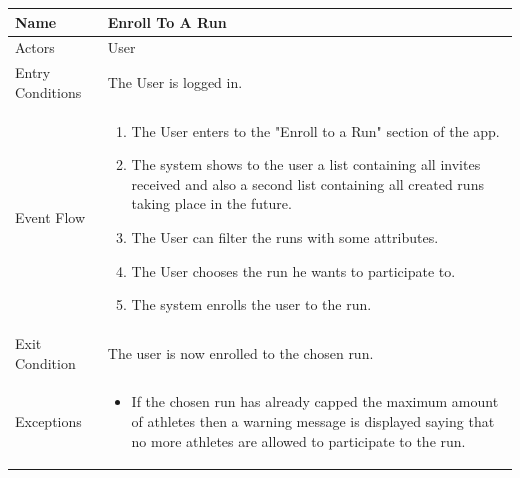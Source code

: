 \begin{enumerate}
\FloatBarrier
\begin{table}[h]
\begin{tabular}{|l|p{}|}
\hline
Name             & Enroll To A Run \\ \hline
Actors           & User  \\ \hline
Entry Conditions & The User is logged in.    \\ \hline
Event Flow       & \begin{enumerate}
            \item The User enters to the "Enroll to a Run" section of the app.
            \item The system shows to the user a list containing all invites received and also a second list containing all created runs taking place in the future.
            \item The User can filter the runs with some attributes.
            \item The User chooses the run he wants to participate to.
            \item The system enrolls the user to the run.
        \end{enumerate}\\ \hline
Exit Condition   & The user is now enrolled to the chosen run.\\ \hline
Exceptions       & \begin{itemize}
\item If the chosen run has already capped the maximum amount of athletes then a warning message is displayed saying that no more athletes are allowed to participate to the run.
\end{itemize}\\ \hline
\end{tabular}
\end{table}
\FloatBarrier


\end{enumerate}
